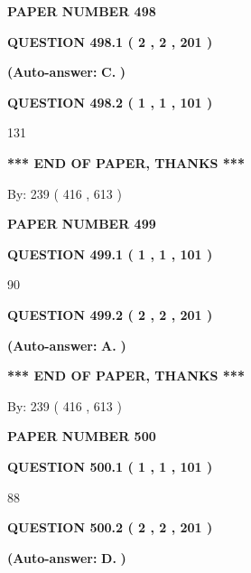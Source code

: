 \documentclass{ctexart}
\begin{document}
   
 {\textbf{ \Large{ PAPER NUMBER  498  }}}
   
   
   
   
  
  
{\textbf{\large{QUESTION
498.1 
 ( 2 , 2 , 201 )
}}}
 
 
{\textbf{(Auto-answer:}}
{\textbf{\large{
C.}}}
{\textbf{)}}
 
 
  
  
{\textbf{\large{QUESTION
498.2 
 ( 1 , 1 , 101 )
}}}

131
   
   
   
   
\vspace{1.0in} 
{\textbf{\large{ *** END OF PAPER, THANKS *** }}} 
   
   
\hspace{1.0in} By: 
 239 ( 416 ,  613 )
   
   
   
   
\newpage 
\setcounter{page}{ 
   499001 } 
   
   
 {\textbf{ \Large{ PAPER NUMBER  499  }}}
   
   
   
   
  
  
{\textbf{\large{QUESTION
499.1 
 ( 1 , 1 , 101 )
}}}

90
  
  
{\textbf{\large{QUESTION
499.2 
 ( 2 , 2 , 201 )
}}}
 
 
{\textbf{(Auto-answer:}}
{\textbf{\large{
A.}}}
{\textbf{)}}
 
 
   
   
   
   
\vspace{1.0in} 
{\textbf{\large{ *** END OF PAPER, THANKS *** }}} 
   
   
\hspace{1.0in} By: 
 239 ( 416 ,  613 )
   
   
   
   
\newpage 
\setcounter{page}{ 
   500001 } 
   
   
 {\textbf{ \Large{ PAPER NUMBER  500  }}}
   
   
   
   
  
  
{\textbf{\large{QUESTION
500.1 
 ( 1 , 1 , 101 )
}}}

88
  
  
{\textbf{\large{QUESTION
500.2 
 ( 2 , 2 , 201 )
}}}
 
 
{\textbf{(Auto-answer:}}
{\textbf{\large{
D.}}}
{\textbf{)}}
 
\end{document}
